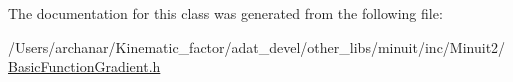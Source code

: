 The documentation for this class was generated from the following file\+:\begin{DoxyCompactItemize}
\item 
/\+Users/archanar/\+Kinematic\+\_\+factor/adat\+\_\+devel/other\+\_\+libs/minuit/inc/\+Minuit2/\mbox{\hyperlink{other__libs_2minuit_2inc_2Minuit2_2BasicFunctionGradient_8h}{Basic\+Function\+Gradient.\+h}}\end{DoxyCompactItemize}

